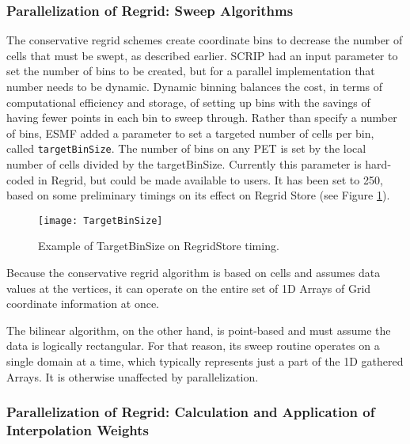 \subsubsection{Parallelization of Regrid: Sweep Algorithms}
The conservative regrid schemes create coordinate bins to decrease the
number of cells that must be swept, as described earlier.  SCRIP
had an input parameter to set the number of bins to be created, but for a
parallel implementation that number needs to be dynamic.  Dynamic binning
balances the cost, in terms of computational efficiency and storage, of setting
up bins with the savings of having fewer points in each bin to sweep through.  
Rather than specify a number of bins, ESMF added a parameter to set a targeted
number of cells per bin, called {\tt targetBinSize}.  The number of bins on any
PET is set by the local number of cells divided by the targetBinSize.  Currently
this parameter is hard-coded in Regrid, but could be made available to users.
It has been set to 250, based on some preliminary timings on its effect on
Regrid Store (see Figure \ref{fig:TargetBinSize}).

\begin{center}
\begin{figure}
\caption{Example of TargetBinSize on RegridStore timing. }
\label{fig:TargetBinSize}
\resizebox{\textwidth}{!}
  {\texttt{[image: TargetBinSize]}}
\end{figure}
\end{center}

Because the conservative regrid algorithm is based on cells and assumes data
values at the vertices, it can operate on the entire set of 1D Arrays of Grid
coordinate information at once.

The bilinear algorithm, on the other hand, is point-based and must assume the
data is logically rectangular.  For that reason, its sweep routine operates on
a single domain at a time, which typically represents just a part of the 1D
gathered Arrays.  It is otherwise unaffected by parallelization.


\subsubsection{Parallelization of Regrid: Calculation and Application of
               Interpolation Weights}

